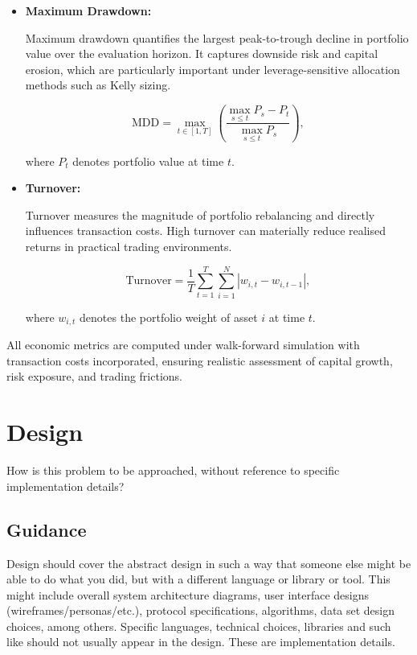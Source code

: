\documentclass{l4proj}
\begin{document}
\begin{itemize}
\item \textbf{Maximum Drawdown:}  

Maximum drawdown quantifies the largest peak-to-trough decline in portfolio value over the evaluation horizon. It captures downside risk and capital erosion, which are particularly important under leverage-sensitive allocation methods such as Kelly sizing.

\[
\text{MDD} = \max_{t \in [1,T]} 
\left(
\frac{\max_{s \le t} P_s - P_t}{\max_{s \le t} P_s}
\right),
\]

where $P_t$ denotes portfolio value at time $t$.

\item \textbf{Turnover:}  

Turnover measures the magnitude of portfolio rebalancing and directly influences transaction costs. High turnover can materially reduce realised returns in practical trading environments.

\[
\text{Turnover} = 
\frac{1}{T} 
\sum_{t=1}^{T} 
\sum_{i=1}^{N} 
|w_{i,t} - w_{i,t-1}|,
\]

where $w_{i,t}$ denotes the portfolio weight of asset $i$ at time $t$.

\end{itemize}

All economic metrics are computed under walk-forward simulation with transaction costs incorporated, ensuring realistic assessment of capital growth, risk exposure, and trading frictions.
\chapter{Design}
How is this problem to be approached, without reference to specific implementation details? 
\section{Guidance}
Design should cover the abstract design in such a way that someone else might be able to do what you did, 
but with a different language or library or tool. This might include overall system architecture diagrams,
user interface designs (wireframes/personas/etc.), protocol specifications, algorithms, data set design choices,
among others. Specific languages, technical choices, libraries and such like should not usually appear in the design. These are implementation details.
\end{document}
